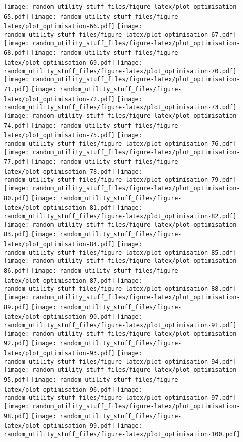 \documentclass[]{article}
\begin{document}
\texttt{[image: random\_utility\_stuff\_files/figure-latex/plot\_optimisation-65.pdf]}
\texttt{[image: random\_utility\_stuff\_files/figure-latex/plot\_optimisation-66.pdf]}
\texttt{[image: random\_utility\_stuff\_files/figure-latex/plot\_optimisation-67.pdf]}
\texttt{[image: random\_utility\_stuff\_files/figure-latex/plot\_optimisation-68.pdf]}
\texttt{[image: random\_utility\_stuff\_files/figure-latex/plot\_optimisation-69.pdf]}
\texttt{[image: random\_utility\_stuff\_files/figure-latex/plot\_optimisation-70.pdf]}
\texttt{[image: random\_utility\_stuff\_files/figure-latex/plot\_optimisation-71.pdf]}
\texttt{[image: random\_utility\_stuff\_files/figure-latex/plot\_optimisation-72.pdf]}
\texttt{[image: random\_utility\_stuff\_files/figure-latex/plot\_optimisation-73.pdf]}
\texttt{[image: random\_utility\_stuff\_files/figure-latex/plot\_optimisation-74.pdf]}
\texttt{[image: random\_utility\_stuff\_files/figure-latex/plot\_optimisation-75.pdf]}
\texttt{[image: random\_utility\_stuff\_files/figure-latex/plot\_optimisation-76.pdf]}
\texttt{[image: random\_utility\_stuff\_files/figure-latex/plot\_optimisation-77.pdf]}
\texttt{[image: random\_utility\_stuff\_files/figure-latex/plot\_optimisation-78.pdf]}
\texttt{[image: random\_utility\_stuff\_files/figure-latex/plot\_optimisation-79.pdf]}
\texttt{[image: random\_utility\_stuff\_files/figure-latex/plot\_optimisation-80.pdf]}
\texttt{[image: random\_utility\_stuff\_files/figure-latex/plot\_optimisation-81.pdf]}
\texttt{[image: random\_utility\_stuff\_files/figure-latex/plot\_optimisation-82.pdf]}
\texttt{[image: random\_utility\_stuff\_files/figure-latex/plot\_optimisation-83.pdf]}
\texttt{[image: random\_utility\_stuff\_files/figure-latex/plot\_optimisation-84.pdf]}
\texttt{[image: random\_utility\_stuff\_files/figure-latex/plot\_optimisation-85.pdf]}
\texttt{[image: random\_utility\_stuff\_files/figure-latex/plot\_optimisation-86.pdf]}
\texttt{[image: random\_utility\_stuff\_files/figure-latex/plot\_optimisation-87.pdf]}
\texttt{[image: random\_utility\_stuff\_files/figure-latex/plot\_optimisation-88.pdf]}
\texttt{[image: random\_utility\_stuff\_files/figure-latex/plot\_optimisation-89.pdf]}
\texttt{[image: random\_utility\_stuff\_files/figure-latex/plot\_optimisation-90.pdf]}
\texttt{[image: random\_utility\_stuff\_files/figure-latex/plot\_optimisation-91.pdf]}
\texttt{[image: random\_utility\_stuff\_files/figure-latex/plot\_optimisation-92.pdf]}
\texttt{[image: random\_utility\_stuff\_files/figure-latex/plot\_optimisation-93.pdf]}
\texttt{[image: random\_utility\_stuff\_files/figure-latex/plot\_optimisation-94.pdf]}
\texttt{[image: random\_utility\_stuff\_files/figure-latex/plot\_optimisation-95.pdf]}
\texttt{[image: random\_utility\_stuff\_files/figure-latex/plot\_optimisation-96.pdf]}
\texttt{[image: random\_utility\_stuff\_files/figure-latex/plot\_optimisation-97.pdf]}
\texttt{[image: random\_utility\_stuff\_files/figure-latex/plot\_optimisation-98.pdf]}
\texttt{[image: random\_utility\_stuff\_files/figure-latex/plot\_optimisation-99.pdf]}
\texttt{[image: random\_utility\_stuff\_files/figure-latex/plot\_optimisation-100.pdf]}
\end{document}
